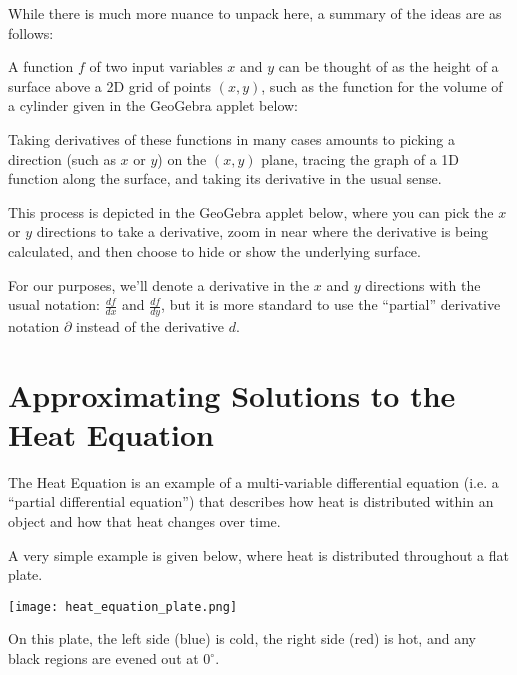 \documentclass{ximera}
\begin{document}
While there is much more nuance to unpack here, a summary of the ideas are as follows:

A function $f$ of two input variables $x$ and $y$ can be thought of as the height of a surface above a 2D grid of points $(x,y)$, such as the function for the volume of a cylinder given in the GeoGebra applet below:

\begin{center}
\end{center}

Taking derivatives of these functions in many cases amounts to picking a direction (such as $x$ or $y$) on the $(x,y)$ plane, tracing the graph of a 1D function along the surface, and taking its derivative in the usual sense. 

This process is depicted in the GeoGebra applet below, where you can pick the $x$ or $y$ directions to take a derivative, zoom in near where the derivative is being calculated, and then choose to hide or show the underlying surface. 

\begin{center}
\end{center}

For our purposes, we'll denote a derivative in the $x$ and $y$ directions with the usual notation: $\frac{df}{dx}$ and $\frac{df}{dy}$, but it is more standard to use the ``partial'' derivative notation $\partial$ instead of the derivative $d$.


\section{Approximating Solutions to the Heat Equation}

The Heat Equation is an example of a multi-variable differential equation (i.e. a ``partial differential equation'') that describes how heat is distributed within an object and how that heat changes over time. 

A very simple example is given below, where heat is distributed throughout a flat plate. 

\begin{center}
    \texttt{[image: heat\_equation\_plate.png]}
\end{center}

On this plate, the left side (blue) is cold, the right side (red) is hot, and any black regions are evened out at $0^\circ$.
\end{document}
